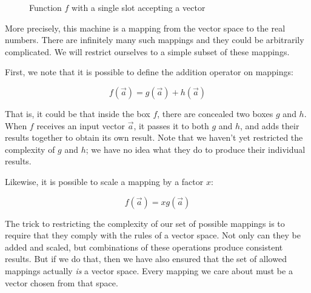 \begin{figure}[h]
    \centering
    \caption{Function $f$ with a single slot accepting a vector} \label{fig:1-slot-box}
\end{figure}

More precisely, this machine is a mapping from the vector space to the real numbers. There are infinitely many such mappings and they could be arbitrarily complicated. We will restrict ourselves to a simple subset of these mappings.

First, we note that it is possible to define the addition operator on mappings:

$$
f(\vec{a}) = g(\vec{a}) + h(\vec{a})
$$

That is, it could be that inside the box $f$, there are concealed two boxes $g$ and $h$. When $f$ receives an input vector $\vec{a}$, it passes it to both $g$ and $h$, and adds their results together to obtain its own result. Note that we haven't yet restricted the complexity of $g$ and $h$; we have no idea what they do to produce their individual results.

Likewise, it is possible to scale a mapping by a factor $x$:

$$
f(\vec{a}) = x g(\vec{a})
$$

The trick to restricting the complexity of our set of possible mappings is to require that they comply with the rules of a vector space. Not only can they be added and scaled, but combinations of these operations produce consistent results. But if we do that, then we have also ensured that the set of allowed mappings actually \textit{is} a vector space. Every mapping we care about must be a vector chosen from that space.

